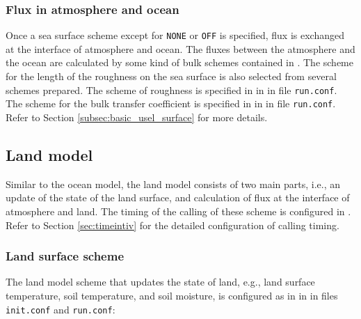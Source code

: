 \subsubsection{Flux in atmosphere and ocean}
Once a sea surface scheme except for \verb|NONE| or \verb|OFF| is specified, flux is exchanged at the interface of atmosphere and ocean. The fluxes between the atmosphere and the ocean are calculated by some kind of bulk schemes contained in \scalerm. The scheme for the length of the roughness on the sea surface is also selected from several schemes prepared. The scheme of roughness is specified in  in  in file \verb|run.conf|. The scheme for the bulk transfer coefficient is specified in  in  in file \verb|run.conf|. Refer to Section \ref{subsec:basic_usel_surface} for more details.


\subsection{Land model} \label{subsec:basic_usel_land}
Similar to the ocean model, the land model consists of two main parts, i.e., an update of the state of the land surface, and calculation of flux at the interface of atmosphere and land. The timing of the calling of these scheme is configured in . Refer to Section \ref{sec:timeintiv} for the detailed configuration of calling timing.

\subsubsection{Land surface scheme}
The land model scheme that updates the state of land, e.g., land surface temperature, soil temperature, and soil moisture, is configured as in  in  in files \verb|init.conf| and \verb|run.conf|:

